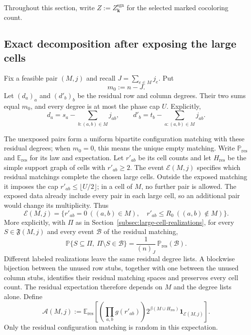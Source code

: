 \documentclass[a4paper,10pt,reqno]{amsart}
\numberwithin{equation}{section}
\theoremstyle{plain}
\theoremstyle{remark}
\begin{document}
Throughout this section, write $Z:=Z_{\mathbf k}^{\mathrm{sgn}}$ for the
selected marked cocoloring count.

\subsection{Exact decomposition after exposing the large cells}

Fix a feasible pair $(M,j)$ and recall $J=\sum_{e\in M}j_e$. Put
\[
  m_0:=n-J.
\]
Let $(d_a)_a$ and $(d'_b)_b$ be the residual row and column degrees. Their two
sums equal $m_0$, and every degree is at most the phase cap $U$.
Explicitly,
\[
 d_a=s_a-\sum_{b:(a,b)\in M}j_{ab},\qquad
 d'_b=t_b-\sum_{a:(a,b)\in M}j_{ab}.
\]

The unexposed pairs form a uniform bipartite configuration matching with these
residual degrees; when $m_0=0$, this means the unique empty matching. Write
$\mathbb P_{\mathrm{res}}$ and $\mathbb E_{\mathrm{res}}$ for its law and
expectation. Let
$r'_{ab}$ be its cell counts and let $H_{\mathrm{res}}$ be the simple support
graph of cells with $r'_{ab}\ge2$. The event $\mathcal E(M,j)$ specifies which
residual matchings complete the chosen large cells. Outside the exposed
matching it imposes the cap $r'_{ab}\le\lfloor U/2\rfloor$; in a cell of
$M$, no further pair is allowed. The exposed data already include every pair
in each large cell, so an additional pair would change its multiplicity.
Thus
\[
 \mathcal E(M,j)=
 \{r'_{ab}=0\ ((a,b)\in M),\quad
   r'_{ab}\le R_0\ ((a,b)\notin M)\}.
\]
More explicitly, with $\Pi$ as in
Section~\ref{subsec:large-cell-realizations}, for every
$S\in\mathfrak F(M,j)$ and every event $\mathcal B$ of the residual
matching,
\begin{equation}
  \mathbb P\{S\subseteq\Pi,\ \Pi\setminus S\in\mathcal B\}
  =
  \frac{1}{(n)_J}\,\mathbb P_{\mathrm{res}}(\mathcal B).
  \label{eq:exposed-residual-factorization}
\end{equation}
Different labeled realizations leave the same residual degree lists. A
blockwise bijection between the unused row stubs, together with one between
the unused column stubs, identifies their residual matching spaces and
preserves every cell count. The residual expectation therefore depends on
$M$ and the degree lists alone. Define
\begin{equation}
  \mathcal A(M,j)
  :=
  \mathbb E_{\mathrm{res}}\!\left[
    \left(\prod_{a,b}g(r'_{ab})\right)
    2^{\beta(M\cup H_{\mathrm{res}})}
    \mathbf 1_{\mathcal E(M,j)}
  \right].
  \label{eq:residual-attachment}
\end{equation}
Only the residual configuration matching is random in this expectation.
\end{document}
